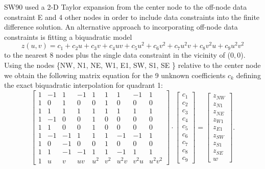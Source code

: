 \documentclass[12pt,letterpaper,margin=0.5in]{article}
\begin{document}
SW90 used a 2-D Taylor expansion from the center node to the off-node data constraint E
and 4 other nodes in order to include data constraints into the finite difference solution.
An alternative approach to incorporating off-node data constraints is fitting a biquadratic model
\begin{equation}
	z(u,v) = c_1 + c_2 u + c_3 v + c_4 u v + c_5 u^2 + c_6 v^2 + c_7 u^2v + c_8 v^2 u + c_9 u^2v^2
	\label{eq:biquadratic}
\end{equation}
to the nearest 8 nodes plus the single data constraint in the vicinity of ($0,0$).  Using the nodes 
\{NW, N1, NE, W1, E1, SW, S1, SE \} relative to the center node we obtain the following matrix equation
for the 9 unknown coefficients $c_k$ defining the exact biquadratic interpolation for quadrant 1:
\begin{equation}
\left[ {\begin{array}{*{20}{c}}
1&{ - 1}&1&{ - 1}&1&1&1&{ - 1}&1\\
1&0&1&0&0&1&0&0&0\\
1&1&1&1&1&1&1&1&1\\
1&{ - 1}&0&0&1&0&0&0&0\\
1&1&0&0&1&0&0&0&0\\
1&{ - 1}&{ - 1}&1&1&1&{ - 1}&{ - 1}&1\\
1&0&{ - 1}&0&0&1&0&0&0\\
1&1&{ - 1}&{ - 1}&1&1&{ - 1}&1&1\\
1&u&v&{uv}&{{u^2}}&{{v^2}}&{{u^2}v}&{{v^2}u}&{{u^2}{v^2}}
\end{array}} \right] \cdot \left[ {\begin{array}{*{20}{c}}
{{c_1}}\\
{{c_2}}\\
{{c_3}}\\
{{c_4}}\\
{{c_5}}\\
{{c_6}}\\
{{c_7}}\\
{{c_8}}\\
{{c_9}}
\end{array}} \right] = \left[ {\begin{array}{*{20}{c}}
{{z_{NW}}}\\
{{z_{N1}}}\\
{{z_{NE}}}\\
{{z_{W1}}}\\
{{z_{E1}}}\\
{{z_{SW}}}\\
{{z_{S1}}}\\
{{z_{SE}}}\\
w
\end{array}} \right].
\end{equation}
\end{document}
